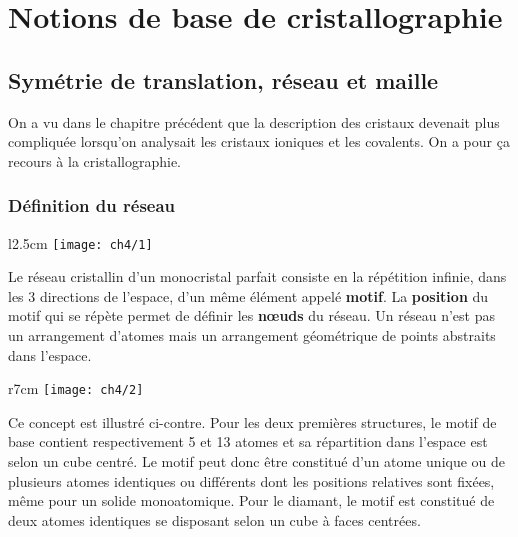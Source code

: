 
\chapter{Notions de base de cristallographie}

\section{Symétrie de translation, réseau et maille}
	On a vu dans le chapitre précédent que la description des cristaux devenait plus compliquée lorsqu'on analysait les cristaux ioniques et les covalents. On a pour ça recours à la cristallographie. 
	\subsection{Définition du réseau}
		\begin{wrapfigure}[4]{l}{2.5cm}
		\vspace{-5mm}
		\texttt{[image: ch4/1]}
		\end{wrapfigure}
		Le réseau cristallin d'un monocristal parfait consiste en la répétition infinie, dans les 3 directions de l'espace, d'un même élément appelé \textbf{motif}. La \textbf{position} du motif qui se répète permet de définir les \textbf{nœuds} du réseau. Un réseau n'est pas un arrangement d'atomes mais un arrangement géométrique de points abstraits dans l'espace.
		
		\begin{wrapfigure}[6]{r}{7cm}
		\vspace{-5mm}
		\texttt{[image: ch4/2]}
		\end{wrapfigure}
		Ce concept est illustré ci-contre. Pour les deux premières structures, le motif de base contient respectivement 5 et 13 atomes et sa répartition dans l'espace est selon un cube centré. Le motif peut donc être constitué d'un atome unique ou de plusieurs atomes identiques ou différents dont les positions relatives sont fixées, même pour un solide monoatomique. Pour le diamant, le motif est constitué de deux atomes identiques se disposant selon un cube à faces centrées.   
		
